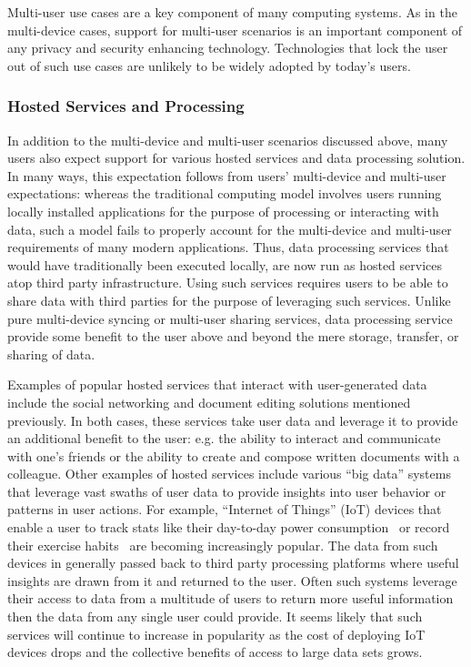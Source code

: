 Multi-user use cases are a key component of many computing systems. As
in the multi-device cases, support for multi-user scenarios is an
important component of any privacy and security enhancing
technology. Technologies that lock the user out of such use cases are
unlikely to be widely adopted by today's users.

\subsubsection{Hosted Services and Processing}

In addition to the multi-device and multi-user scenarios discussed
above, many users also expect support for various hosted services and
data processing solution. In many ways, this expectation follows from
users' multi-device and multi-user expectations: whereas the
traditional computing model involves users running locally installed
applications for the purpose of processing or interacting with data,
such a model fails to properly account for the multi-device and
multi-user requirements of many modern applications. Thus, data
processing services that would have traditionally been executed
locally, are now run as hosted services atop third party
infrastructure. Using such services requires users to be able to share
data with third parties for the purpose of leveraging such
services. Unlike pure multi-device syncing or multi-user sharing
services, data processing service provide some benefit to the user
above and beyond the mere storage, transfer, or sharing of data.

Examples of popular hosted services that interact with user-generated
data include the social networking and document editing solutions
mentioned previously. In both cases, these services take user data and
leverage it to provide an additional benefit to the user: e.g. the
ability to interact and communicate with one's friends or the ability
to create and compose written documents with a colleague. Other
examples of hosted services include various ``big data'' systems that
leverage vast swaths of user data to provide insights into user
behavior or patterns in user actions. For example, ``Internet of
Things'' (IoT) devices that enable a user to track stats like their
day-to-day power consumption~\cite{neurio} or record their exercise
habits~\cite{fitbit} are becoming increasingly popular. The data from
such devices in generally passed back to third party processing
platforms where useful insights are drawn from it and returned to the
user. Often such systems leverage their access to data from a
multitude of users to return more useful information then the data
from any single user could provide. It seems likely that such services
will continue to increase in popularity as the cost of deploying IoT
devices drops and the collective benefits of access to large data sets
grows.


